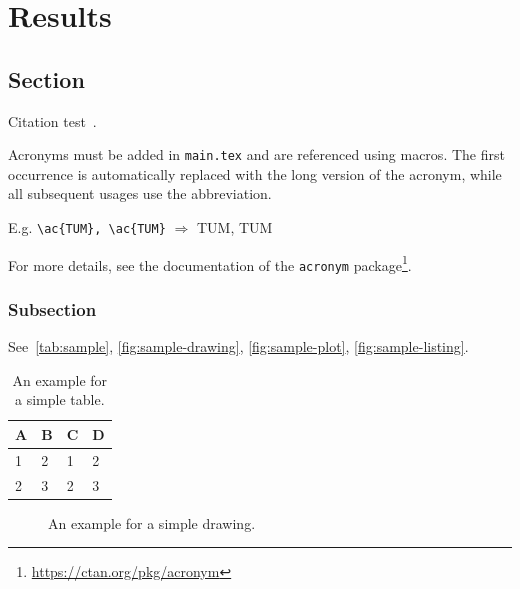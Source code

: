 
\chapter{Results}\label{chapter:results}

\section{Section}
Citation test~\parencite{latex}.

Acronyms must be added in \texttt{main.tex} and are referenced using macros. The first occurrence is automatically replaced with the long version of the acronym, while all subsequent usages use the abbreviation.

E.g. \texttt{\textbackslash ac\{TUM\}, \textbackslash ac\{TUM\}} $\Rightarrow$ \ac{TUM}, \ac{TUM}

For more details, see the documentation of the \texttt{acronym} package\footnote{\url{https://ctan.org/pkg/acronym}}.
\subsection{Subsection}

See~\autoref{tab:sample}, \autoref{fig:sample-drawing}, \autoref{fig:sample-plot}, \autoref{fig:sample-listing}.

\begin{table}[htpb]
  \caption[Example table]{An example for a simple table.}\label{tab:sample}
  \centering
  \begin{tabular}{l l l l}
    \toprule
      A & B & C & D \\
    \midrule
      1 & 2 & 1 & 2 \\
      2 & 3 & 2 & 3 \\
    \bottomrule
  \end{tabular}
\end{table}

\begin{figure}[htpb]
  \centering
  \caption[Example drawing]{An example for a simple drawing.}\label{fig:sample-drawing}
\end{figure}

